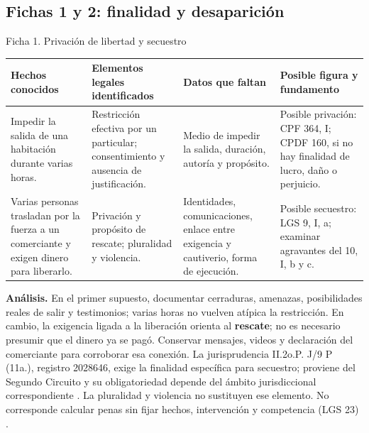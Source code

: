 \documentclass[spanish,letterpaper,oneside]{article}
\makeatletter
\renewcommand{\arraystretch}{1.08}
\newcommand{\tablaficha}[1]{%
  \begingroup\fontsize{10.4}{11.7}\selectfont
  \setlength{\tabcolsep}{3pt}\renewcommand{\arraystretch}{1.12}
  \begin{tabularx}{\linewidth}{@{}*{4}{>{\raggedright\arraybackslash}X}@{}}
  \toprule
  \textbf{Hechos conocidos} & \textbf{Elementos legales identificados} & \textbf{Datos que faltan} & \textbf{Posible figura y fundamento} \\
  \midrule
  #1
  \bottomrule
  \end{tabularx}
  \endgroup\par\vspace{4pt}
}
\makeatother
\begin{document}
\clearpage
\subsection*{Fichas 1 y 2: finalidad y desaparición}
\begin{casoestudio}{Ficha 1. Privación de libertad y secuestro}
\tablaficha{
Impedir la salida de una habitación durante varias horas. & Restricción efectiva por un particular; consentimiento y ausencia de justificación. & Medio de impedir la salida, duración, autoría y propósito. & Posible privación: CPF 364, I; CPDF 160, si no hay finalidad de lucro, daño o perjuicio. \\
\midrule
Varias personas trasladan por la fuerza a un comerciante y exigen dinero para liberarlo. & Privación y propósito de rescate; pluralidad y violencia. & Identidades, comunicaciones, enlace entre exigencia y cautiverio, forma de ejecución. & Posible secuestro: LGS 9, I, a; examinar agravantes del 10, I, b y c. \\
}
\textbf{Análisis.} En el primer supuesto, documentar cerraduras, amenazas, posibilidades reales de salir y testimonios; varias horas no vuelven atípica la restricción. En cambio, la exigencia ligada a la liberación orienta al \textbf{rescate}; no es necesario presumir que el dinero ya se pagó. Conservar mensajes, videos y declaración del comerciante para corroborar esa conexión. La jurisprudencia II.2o.P. J/9 P (11a.), registro 2028646, exige la finalidad específica para secuestro; proviene del Segundo Circuito y su obligatoriedad depende del ámbito jurisdiccional correspondiente \citep{scjnSecuestroS5}. La pluralidad y violencia no sustituyen ese elemento. No corresponde calcular penas sin fijar hechos, intervención y competencia (LGS 23) \citep{secuestroS5}.
\end{casoestudio}
\end{document}
